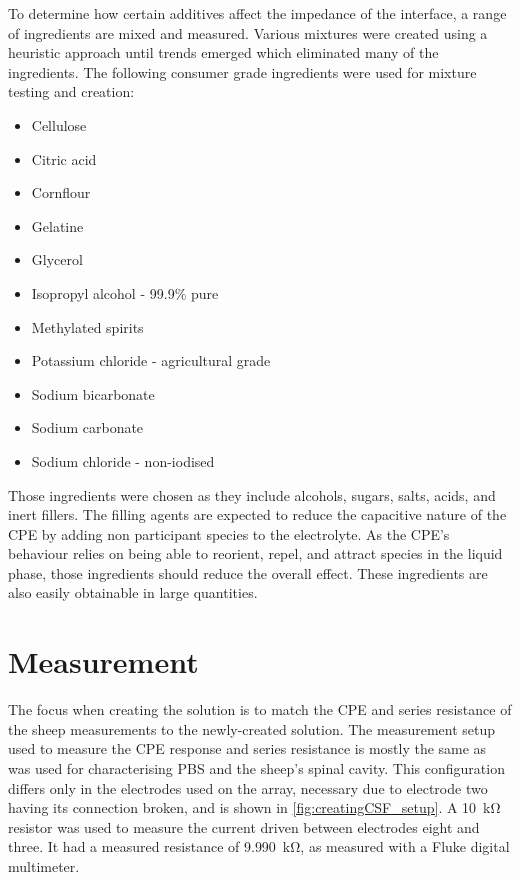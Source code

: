   To determine how certain additives affect the impedance of the interface, a range of ingredients are mixed and measured.
  Various mixtures were created using a heuristic approach until trends emerged which eliminated many of the ingredients.
  The following consumer grade ingredients were used for mixture testing and creation:
  \begin{itemize}
      \item Cellulose
      \item Citric acid
      \item Cornflour
      \item Gelatine
      \item Glycerol
      \item Isopropyl alcohol - 99.9\% pure
      \item Methylated spirits
      \item Potassium chloride - agricultural grade
      \item Sodium bicarbonate
      \item Sodium carbonate
      \item Sodium chloride - non-iodised
  \end{itemize}

  Those ingredients were chosen as they include alcohols, sugars, salts, acids, and inert fillers.
  The filling agents are expected to reduce the capacitive nature of the CPE by adding non participant species to the electrolyte.
  As the CPE's behaviour relies on being able to reorient, repel, and attract species in the liquid phase, those ingredients should reduce the overall effect.
  These ingredients are also easily obtainable in large quantities.


\section{Measurement}

  The focus when creating the solution is to match the CPE and series resistance of the sheep measurements to the newly-created solution.
  The measurement setup used to measure the CPE response and series resistance is mostly the same as was used for characterising PBS and the sheep's spinal cavity.
  This configuration differs only in the electrodes used on the array, necessary due to electrode two having its connection broken, and is shown in \cref{fig:creatingCSF_setup}.
  A \SI{10}{\kilo\ohm} resistor was used to measure the current driven between electrodes eight and three.
  It had a measured resistance of \SI{9.990}{\kilo\ohm}, as measured with a Fluke digital multimeter.

